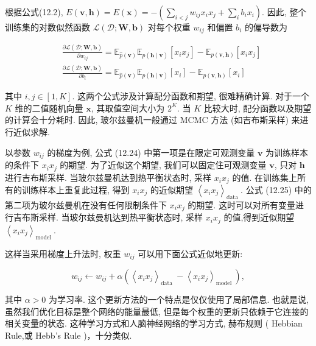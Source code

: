 \documentclass[10pt]{article}
\begin{document}
根据公式(12.2), $E(\boldsymbol{v}, \boldsymbol{h})=E(\boldsymbol{x})=-\left(\sum_{i<j} w_{i j} x_{i} x_{j}+\sum_{i} b_{i} x_{i}\right)$. 因此, 整个训练集的对数似然函数 $\mathcal{L}(\mathcal{D} ; \boldsymbol{W}, \boldsymbol{b})$ 对每个权重 $w_{i j}$ 和偏置 $b_{i}$ 的偏导数为


\begin{align*}
& \frac{\partial \mathcal{L}(\mathcal{D} ; \boldsymbol{W}, \boldsymbol{b})}{\partial w_{i j}}=\mathbb{E}_{\hat{p}(\boldsymbol{v})} \mathbb{E}_{p(\boldsymbol{h} \mid \boldsymbol{v})}\left[x_{i} x_{j}\right]-\mathbb{E}_{p(\boldsymbol{v}, \boldsymbol{h})}\left[x_{i} x_{j}\right]  \tag{12.24}\\
& \frac{\partial \mathcal{L}(\mathcal{D} ; \boldsymbol{W}, \boldsymbol{b})}{\partial b_{i}}=\mathbb{E}_{\hat{p}(\boldsymbol{v})} \mathbb{E}_{p(\boldsymbol{h} \mid \boldsymbol{v})}\left[x_{i}\right]-\mathbb{E}_{p(\boldsymbol{v}, \boldsymbol{h})}\left[x_{i}\right] \tag{12.25}
\end{align*}


其中 $i, j \in[1, K]$. 这两个公式涉及计算配分函数和期望, 很难精确计算. 对于一个 $K$ 维的二值随机向量 $\boldsymbol{x}$, 其取值空间大小为 $2^{K}$. 当 $K$ 比较大时, 配分函数以及期望的计算会十分耗时. 因此, 玻尔兹曼机一般通过 MCMC 方法 (如吉布斯采样) 来进行近似求解.

以参数 $w_{i j}$ 的梯度为例, 公式 (12.24) 中第一项是在限定可观测变量 $\boldsymbol{v}$ 为训练样本的条件下 $x_{i} x_{j}$ 的期望. 为了近似这个期望, 我们可以固定住可观测变量 $\boldsymbol{v}$, 只对 $\boldsymbol{h}$ 进行吉布斯采样. 当玻尔兹曼机达到热平衡状态时, 采样 $x_{i} x_{j}$ 的值. 在训练集上所有的训练样本上重复此过程, 得到 $x_{i} x_{j}$ 的近似期望 $\left\langle x_{i} x_{j}\right\rangle_{\text {data }}$. 公式 (12.25) 中的第二项为玻尔兹曼机在没有任何限制条件下 $x_{i} x_{j}$ 的期望. 这时可以对所有变量进行吉布斯采样. 当玻尔兹曼机达到热平衡状态时, 采样 $x_{i} x_{j}$ 的值,得到近似期望 $\left\langle x_{i} x_{j}\right\rangle_{\text {model }}$.

这样当采用梯度上升法时, 权重 $w_{i j}$ 可以用下面公式近似地更新:


\begin{equation*}
w_{i j} \leftarrow w_{i j}+\alpha\left(\left\langle x_{i} x_{j}\right\rangle_{\text {data }}-\left\langle x_{i} x_{j}\right\rangle_{\text {model }}\right), \tag{12.26}
\end{equation*}


其中 $\alpha>0$ 为学习率. 这个更新方法的一个特点是仅仅使用了局部信息. 也就是说, 虽然我们优化目标是整个网络的能量最低, 但是每个权重的更新只依赖于它连接的相关变量的状态. 这种学习方式和人脑神经网络的学习方式, 赫布规则 ( Hebbian Rule,或 Hebb’s Rule )，十分类似.
\end{document}
